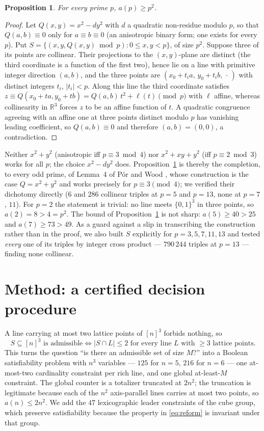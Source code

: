 \documentclass[11pt,a4paper]{article}
\newtheorem{proposition}{Proposition}
\begin{document}
\begin{proposition}\label{p:alg}
For every prime $p$, $a(p)\ge p^2$.
\end{proposition}
\begin{proof}
Let $Q(x,y)=x^2-dy^2$ with $d$ a quadratic non-residue modulo $p$, so that $Q(a,b)\equiv0$ only for
$a\equiv b\equiv0$ (an anisotropic binary form; one exists for every $p$).  Put
$S=\{(x,y,Q(x,y)\bmod p):0\le x,y<p\}$, of size $p^2$.  Suppose three of its points are collinear.  Their
projections to the $(x,y)$-plane are distinct (the third coordinate is a function of the first two), hence lie
on a line with primitive integer direction $(a,b)$, and the three points are $(x_0+t_ia,\,y_0+t_ib,\,\cdot\,)$
with distinct integers $t_i$, $|t_i|<p$.  Along this line the third coordinate satisfies
$z\equiv Q(x_0+ta,y_0+tb)=Q(a,b)\,t^2+\ell(t)\pmod p$ with $\ell$ affine, whereas collinearity in
$\mathbb R^3$ forces $z$ to be an affine function of $t$.  A quadratic congruence agreeing with an affine one
at three points distinct modulo $p$ has vanishing leading coefficient, so $Q(a,b)\equiv0$ and therefore
$(a,b)=(0,0)$, a contradiction.
\end{proof}
Neither $x^2+y^2$ (anisotropic iff $p\equiv3\bmod 4$) nor $x^2+xy+y^2$ (iff $p\equiv2\bmod3$) works for all
$p$; the choice $x^2-dy^2$ does.  Proposition~\ref{p:alg} is thereby the completion, to every odd prime, of
Lemma~4 of P\'or and Wood \cite{PorWood}, whose construction is the case $Q=x^2+y^2$ and works precisely for
$p\equiv3\pmod4$; we verified their dichotomy directly ($6$ and $286$ collinear triples at $p=5$ and $p=13$, none
at $p=7$, $11$).  For $p=2$ the statement is trivial: no line meets $\{0,1\}^3$ in three points, so
$a(2)=8>4=p^2$.  The bound of Proposition~\ref{p:alg} is not sharp: $a(5)\ge40>25$ and
$a(7)\ge73>49$.  As a guard against a slip in transcribing the construction rather than in the proof,
we also built $S$ explicitly for $p=3,5,7,11,13$ and tested \emph{every} one of its triples by integer cross
product --- $790\,244$ triples at $p=13$ --- finding none collinear.

\section{Method: a certified decision procedure}
A line carrying at most two lattice points of $[n]^3$ forbids nothing, so
\begin{equation}\label{eq:reform}
S\subseteq[n]^3 \text{ is admissible}\iff |S\cap L|\le 2 \text{ for every line } L \text{ with } \ge3 \text{ lattice points.}
\end{equation}
This turns the question ``is there an admissible set of size $M$?'' into a Boolean satisfiability problem with
$n^3$ variables --- $125$ for $n=5$, $216$ for $n=6$ --- one at-most-two cardinality constraint per rich line,
and one global at-least-$M$ constraint.  The global counter is a totalizer truncated at $2n^2$; the truncation
is legitimate because each of the $n^2$ axis-parallel lines carries at most two points, so $a(n)\le 2n^2$.
We add the $47$ lexicographic leader constraints of the cube group, which preserve satisfiability because the
property in \eqref{eq:reform} is invariant under that group.
\end{document}
